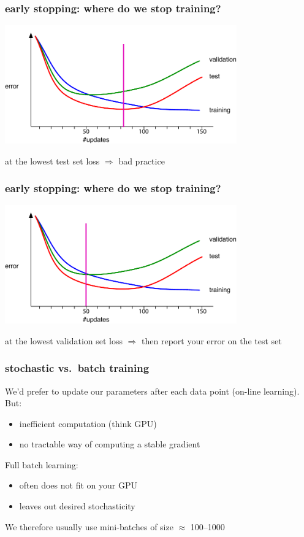 \documentclass[USenglish,pdftex,compress,10pt,svgnamesi,handout]{beamer}
\begin{document}
\begin{frame}
    \frametitle{early stopping: where do we stop training?}
\includegraphics[width=10cm]{pics/train-val-test-3.pdf}

at the lowest test set loss $\Longrightarrow$ bad practice
\end{frame}

\begin{frame}
    \frametitle{early stopping: where do we stop training?}
\includegraphics[width=10cm]{pics/train-val-test-2.pdf}

at the lowest validation set loss $\Longrightarrow$ then report your error on the test set
\end{frame}


\begin{frame}
\frametitle{stochastic vs.\ batch training}
We'd prefer to update our parameters after each data point (on-line learning).
But:
\begin{itemize}
\item inefficient computation (think GPU)
\item no tractable way of computing a stable gradient
\end{itemize}

Full batch learning:
\begin{itemize}
\item often does not fit on your GPU
\item leaves out desired stochasticity
\end{itemize}

We therefore usually use mini-batches of size $\approx$ 100--1000
\end{frame}
\end{document}
